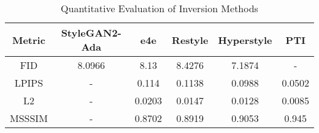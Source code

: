 \begin{table}[ht!]
    \centering
    \begin{tabular}{|c|c|c|c|c|c|}
        \hline
          Metric  &   StyleGAN2-Ada &       e4e &   Restyle &   Hyperstyle &    PTI \\
        \hline
        FID    &          8.0966 & 8.13   &    8.4276 &       7.1874 & -      \\
        \hline
         LPIPS  &        -      & 0.114  &    0.1138 &       0.0988 &   0.0502 \\
         \hline
         L2     &        -      & 0.0203 &    0.0147 &       0.0128 &   0.0085 \\
         \hline
         MSSSIM &        -      & 0.8702 &    0.8919 &       0.9053 &   0.945  \\
        \hline
    \end{tabular}
    \caption{Quantitative Evaluation of Inversion Methods}
    \label{tab:inversion_metrics}
\end{table}
